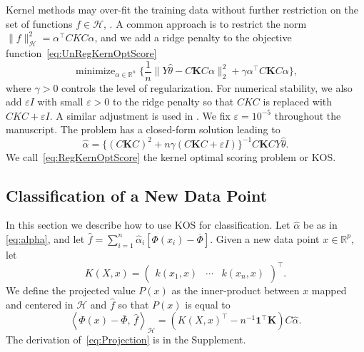 \documentclass[twoside, onecolumn]{article}
\def\R{\mathbb{R}}
\def\Hcal{\mathcal{H}}
\def\Hcal{\mathcal{H}}
\def\Score{\widehat{\theta}}
\DeclareMathOperator*{\minimize}{minimize}
\begin{document}




Kernel methods may over-fit the training data without further restriction on the set of functions $f\in \Hcal$, \cite{hastie_elements_2009, bernhard_scholkopf_learning_2002,RKHS_tutorial2012}. A common approach is to restrict the norm $\|f\|_{\Hcal}^2 = \alpha^{\top}CKC\alpha$, and we add a ridge penalty to the objective function~\eqref{eq:UnRegKernOptScore}
\begin{equation}\label{eq:RegKernOptScore}
\minimize_{\alpha\in \mathbb{R}^n}\bigg\{\frac{1}{n}\|Y\Score-C\mathbf{K}C\alpha\|_{2}^{2}+\gamma \alpha^{\top}C\mathbf{K}C\alpha\bigg\},
\end{equation}
where $\gamma > 0$ controls the level of regularization. For numerical stability, we also add $\varepsilon I$ with small $\varepsilon > 0$ to the ridge penalty so that $CKC$ is replaced with $CKC + \varepsilon I$. A similar adjustment is used in \cite{mika_fisher_1999,roth2000nonlinear}. We fix $\varepsilon=10^{-5}$ throughout the manuscript. The problem has a closed-form solution leading to 
\begin{equation}\label{eq:alpha}
\widehat{\alpha}= \{(C\mathbf{K}C)^2+n\gamma(C\mathbf{K}C+\varepsilon I)\}^{-1}C\mathbf{K}CY\widehat \theta.
\end{equation}
 We call~\eqref{eq:RegKernOptScore} the kernel optimal scoring problem or KOS.



\subsection{Classification of a New Data Point}\label{sec:Projection}
In this section we describe how to use KOS for classification. Let $\widehat \alpha$ be as in \eqref{eq:alpha}, and let $\widehat f = \sum_{i=1}^n \widehat \alpha_i[\Phi(x_i) - \overline \Phi]$. Given a new data point $x\in \R^{p}$, let
$$
K(X,x)=
\begin{pmatrix}
k(x_1, x)&
\cdots&
k(x_n,x)\end{pmatrix}^{\top}.
$$
We define the projected value $P(x)$ as the inner-product between $x$ mapped and centered in $\Hcal$ and $\widehat f$ so that $P(x)$ is equal to
\begin{equation}\label{eq:Projection}
\left<\Phi(x)-\overline{\Phi},\,
\widehat{f}\right>_{\mathcal{H}}=(K(X,x)^{\top}-n^{-1}\mathbf{1}^{\top}\mathbf{K})C\widehat\alpha.
\end{equation}
The derivation of~\eqref{eq:Projection} is in the Supplement.
\end{document}
